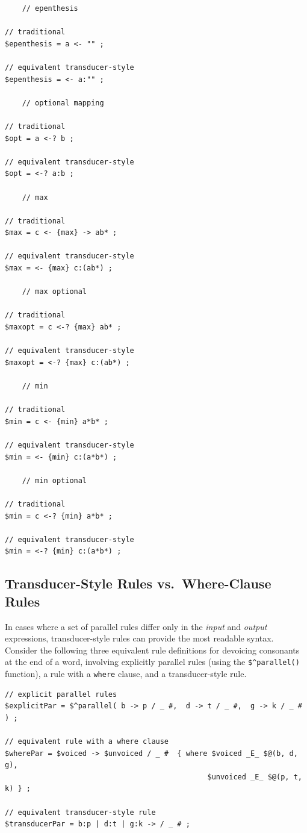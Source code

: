 \begin{Verbatim}
	// epenthesis

// traditional
$epenthesis = a <- "" ;

// equivalent transducer-style
$epenthesis = <- a:"" ;

	// optional mapping

// traditional
$opt = a <-? b ;

// equivalent transducer-style
$opt = <-? a:b ;

	// max 

// traditional
$max = c <- {max} -> ab* ;

// equivalent transducer-style
$max = <- {max} c:(ab*) ;

	// max optional

// traditional
$maxopt = c <-? {max} ab* ;

// equivalent transducer-style
$maxopt = <-? {max} c:(ab*) ;

	// min

// traditional
$min = c <- {min} a*b* ;

// equivalent transducer-style
$min = <- {min} c:(a*b*) ;

	// min optional

// traditional
$min = c <-? {min} a*b* ;

// equivalent transducer-style
$min = <-? {min} c:(a*b*) ;
\end{Verbatim}

\subsection{Transducer-Style Rules vs.\ Where-Clause Rules}

In cases where a set of parallel rules differ only in the \emph{input} and \emph{output} expressions,
transducer-style rules can provide the most readable syntax.  Consider the following three equivalent
rule definitions for devoicing consonants at the end of a word, involving explicitly parallel rules (using the
\verb!$^parallel()! function), a rule with a \texttt{where} clause, and a transducer-style rule.

\begin{Verbatim}
// explicit parallel rules
$explicitPar = $^parallel( b -> p / _ #,  d -> t / _ #,  g -> k / _ # ) ;

// equivalent rule with a where clause
$wherePar = $voiced -> $unvoiced / _ #  { where $voiced _E_ $@(b, d, g),
		                                       $unvoiced _E_ $@(p, t, k) } ;

// equivalent transducer-style rule
$transducerPar = b:p | d:t | g:k -> / _ # ;
\end{Verbatim}

